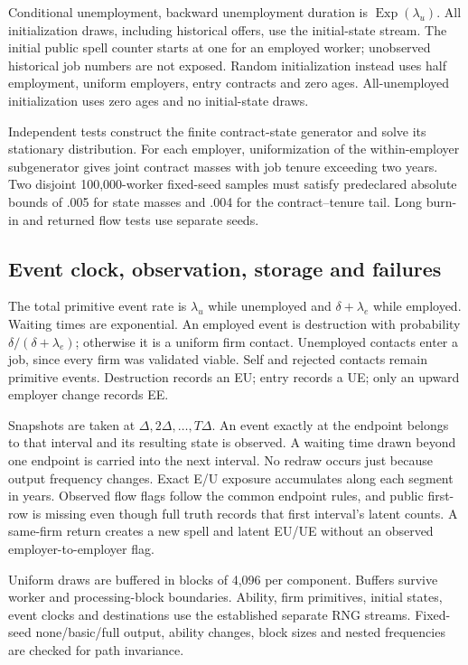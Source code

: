 \documentclass[11pt,letterpaper]{article}
\newcommand{\code}[1]{\texttt{\detokenize{#1}}}
\begin{document}
Conditional unemployment, backward unemployment duration is
$\operatorname{Exp}(\lambda_u)$. All initialization draws, including
historical offers, use the initial-state stream. The initial public
spell counter starts at one for an employed worker; unobserved historical
job numbers are not exposed. Random initialization instead uses half
employment, uniform employers, entry contracts and zero ages.
All-unemployed initialization uses zero ages and no initial-state draws.

Independent tests construct the finite contract-state generator and
solve its stationary distribution. For each employer, uniformization of
the within-employer subgenerator gives joint contract masses with
job tenure exceeding two years. Two disjoint 100,000-worker fixed-seed
samples must satisfy predeclared absolute bounds of .005 for state
masses and .004 for the contract--tenure tail. Long burn-in and returned
flow tests use separate seeds.

\subsection{Event clock, observation, storage and failures}
The total primitive event rate is $\lambda_u$ while unemployed and
$\delta+\lambda_e$ while employed. Waiting times are exponential. An
employed event is destruction with probability
$\delta/(\delta+\lambda_e)$; otherwise it is a uniform firm contact.
Unemployed contacts enter a job, since every firm was validated viable.
Self and rejected contacts remain primitive events. Destruction records
an EU; entry records a UE; only an upward employer change records EE.

Snapshots are taken at $\Delta,2\Delta,\ldots,T\Delta$. An event exactly
at the endpoint belongs to that interval and its resulting state is
observed. A waiting time drawn beyond one endpoint is carried into the
next interval. No redraw occurs just because output frequency changes.
Exact E/U exposure accumulates along each segment in years. Observed
flow flags follow the common endpoint rules, and public first-row
\code{ntransitions} is missing even though full truth records that first
interval's latent counts. A same-firm return creates a new spell and
latent EU/UE without an observed employer-to-employer flag.

Uniform draws are buffered in blocks of 4,096 per component. Buffers
survive worker and processing-block boundaries. Ability, firm primitives,
initial states, event clocks and destinations use the established
separate RNG streams. Fixed-seed none/basic/full output, ability changes,
block sizes and nested frequencies are checked for path invariance.
\end{document}
